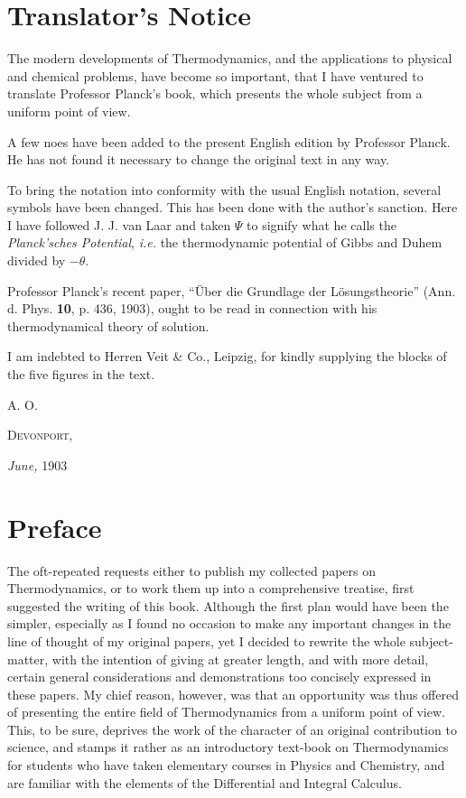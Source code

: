 \documentclass[oneside,12pt]{book}
\newcommand{\iit}[1]{\textit{#1}}
\begin{document}
\chapter{Translator's Notice}
The modern developments of Thermodynamics, and the applications to physical and chemical problems, have become so important, that I have ventured to translate Professor Planck's book, which presents the whole subject from a uniform point of view. \par 

A few noes have been added to the present English edition by Professor Planck. He has not found it necessary to change the original text in any way. \par 

To bring the notation into conformity with the usual English notation, several symbols have been changed. This has been done with the author's sanction. Here I have followed J. J. van Laar and taken $\Psi$ to signify what he calls the \iit{Planck'sches Potential}, \iit{i.e.} the thermodynamic potential of Gibbs and Duhem divided by $-\theta$. \par 

Professor Planck's recent paper, ``\"Uber die Grundlage der L\"osungstheorie'' (Ann. d. Phys. \textbf{10}, p. 436, 1903), ought to be read in connection with his thermodynamical theory of solution. \par 

I am indebted to Herren Veit \& Co., Leipzig, for kindly supplying the blocks of the five figures in the text. \par 

\begin{flushright}
    A. O.
\end{flushright}
\textsc{Devonport,} \par 
\textit{June,} 1903 

\chapter{Preface}
The oft-repeated requests either to publish my collected papers on Thermodynamics, or to work them up into a comprehensive treatise, first suggested the writing of this book. Although the first plan would have been the simpler, especially as I found no occasion to make any important changes in the line of thought of my original papers, yet I decided to rewrite the whole subject-matter, with the intention of giving at greater length, and with more detail, certain general considerations and demonstrations too concisely expressed in these papers. My chief reason, however, was that an opportunity was thus offered of presenting the entire field of Thermodynamics from a uniform point of view. This, to be sure, deprives the work of the character of an original contribution to science, and stamps it rather as an introductory text-book on Thermodynamics for students who have taken elementary courses in Physics and Chemistry, and are familiar with the elements of the Differential and Integral Calculus. \par 
\end{document}
